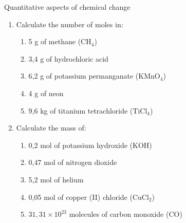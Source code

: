\begin{eocexercises}{Quantitative aspects of chemical change}
\begin{enumerate}[noitemsep, label=\textbf{\arabic*}. ]
\begin{enumerate}[noitemsep, label=\textbf{\alph*}. ]
\begin{enumerate}[noitemsep, label=\textbf{\roman*}. ]
\end{enumerate}
                \label{m38712*uid137}\item In the compound potassium sulphate ($\text{K}{}_{2}\text{SO}{}_{4}$), oxygen makes up x\% of the mass of the compound. x = ...
\label{m38712*id286432}\begin{enumerate}[noitemsep, label=\textbf{\roman*}. ] 
            \label{m38712*uid138}\item 36.8
\label{m38712*uid139}\item 9,2
\label{m38712*uid140}\item 4
\label{m38712*uid141}\item 18,3
\end{enumerate}
                \label{m38712*uid142}\item The concentration of a $150\phantom{\rule{2pt}{0ex}}{\text{cm}}^{3}$ solution, containing 5 g of $\text{NaCl}$ is...
\label{m38712*id286512}\begin{enumerate}[noitemsep, label=\textbf{\roman*}. ] 
            \label{m38712*uid143}\item $0,09\phantom{\rule{2pt}{0ex}}\text{M}$
\label{m38712*uid144}\item $5,7\phantom{\rule{2pt}{0ex}}\ensuremath{\times}10{}^{-4}\phantom{\rule{2pt}{0ex}}\text{M}$
\label{m38712*uid145}\item $0,57\phantom{\rule{2pt}{0ex}}\text{M}$
\label{m38712*uid146}\item $0,03\phantom{\rule{2pt}{0ex}}\text{M}$
\end{enumerate}
                \end{enumerate}
        \item Calculate the number of moles in:
\label{m38712*id6342}\begin{enumerate}[noitemsep, label=\textbf{\alph*}. ] 
            \item 5 g of methane (${\text{CH}}_{4}$)\item 3,4 g of hydrochloric acid\item 6,2 g of potassium permanganate (${\text{KMnO}}_{4}$)\item 4 g of neon\item 9,6 kg of titanium tetrachloride (${\text{TiCl}}_{4}$)\end{enumerate}
        \item Calculate the mass of:\label{m38712*id7342}\begin{enumerate}[noitemsep, label=\textbf{\alph*}. ] 
            \item 0,2 mol of potassium hydroxide ($\text{KOH}$)\item 0,47 mol of nitrogen dioxide\item 5,2 mol of helium\item 0,05 mol of copper (II) chloride (${\text{CuCl}}_{2}$)\item $31,31\ensuremath{\times}{10}^{23}$ molecules of carbon monoxide ($\text{CO}$)\end{enumerate}

\end{enumerate}
\end{eocexercises}
